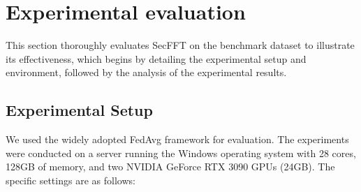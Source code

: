 \documentclass[lettersize,journal]{IEEEtran}
\begin{document}






\section{Experimental evaluation}
This section thoroughly evaluates SecFFT on the benchmark dataset to illustrate its effectiveness, which begins by detailing the experimental setup and environment, followed by the analysis of the experimental results.

\subsection{Experimental Setup}
We used the widely adopted FedAvg framework for evaluation. The experiments were conducted on a server running the Windows operating system with 28 cores, 128GB of memory, and two NVIDIA GeForce RTX 3090 GPUs (24GB). The specific settings are as follows:



\end{document}
